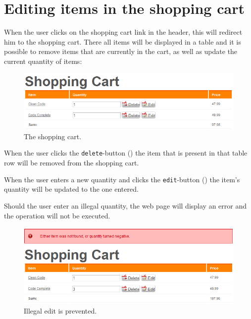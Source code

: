 \section{Editing items in the shopping cart}
\label{sec:editin_items}

When the user clicks on the shopping cart link in the header, this will redirect him to the shopping cart. There all items will be displayed in a table and it is possible to remove items that are currently in the cart, as well as update the current quantity of items:

\begin{figure}[H]
\begin{center}
\includegraphics[width=\textwidth]{gfx/shopping_cart.png}
\caption{The shopping cart.}
\label{fig:shopping_cart}
\end{center}
\end{figure}

When the user clicks the \texttt{delete}-button () the item that is present in that table row will be removed from the shopping cart.

When the user enters a new quantity and clicks the \texttt{edit}-button () the item's quantity will be updated to the one entered.

Should the user enter an illegal quantity, the web page will display an error and the operation will not be executed.

\begin{figure}[H]
\begin{center}
\includegraphics[width=\textwidth]{gfx/illegal_edit.png}
\caption{Illegal edit is prevented.}
\label{fig:illegal_edit}
\end{center}
\end{figure}